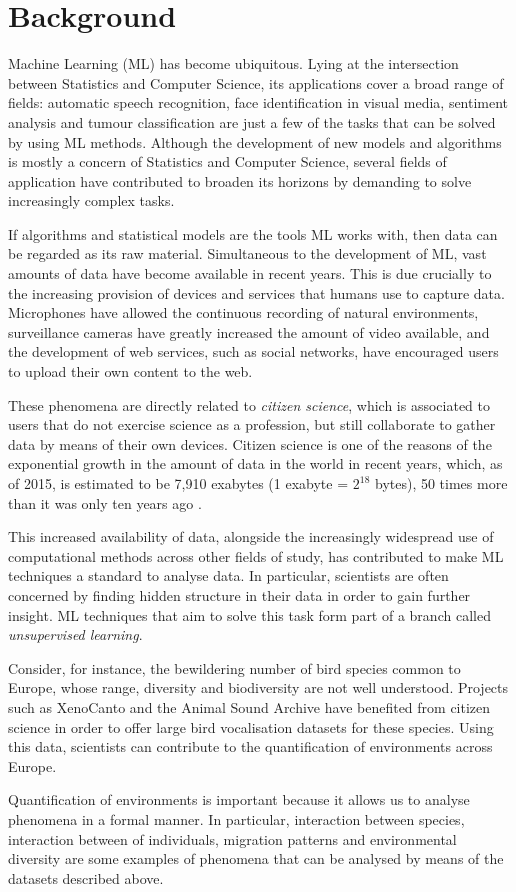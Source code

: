 \documentclass[../main.tex]{subfiles}
\begin{document}
 \label{chapter_intro}
\section{Background}
Machine Learning (ML) has become ubiquitous. Lying at the intersection between Statistics and Computer Science, its applications cover a broad range of fields: automatic speech recognition, face identification in visual media, sentiment analysis and tumour classification are just a few of the tasks that can be solved by using ML methods. Although the development of new models and algorithms is mostly a concern of Statistics and Computer Science, several fields of application have contributed to broaden its horizons by demanding to solve increasingly complex tasks. 
\par If algorithms and statistical models are the tools ML works with, then data can be regarded as its raw material. Simultaneous to the development of ML, vast amounts of data have become available in recent years. This is due crucially to the increasing provision of devices and services that humans use to capture data. Microphones have allowed the continuous recording of natural environments, surveillance cameras have greatly increased the amount of video available, and the development of web services, such as social networks, have encouraged users to upload their own content to the web. 
\par These phenomena are directly related to \emph{citizen science}, which is associated to users that do not exercise science as a profession, but still collaborate to gather data by means of their own devices. Citizen science is one of the reasons of the exponential growth in the amount of data in the world in recent years, which, as of 2015, is estimated to be 7,910 exabytes (1 exabyte = $2^{18}$ bytes), 50 times more than it was only ten years ago \cite{TheEconomistOnline2011}.
\par This increased availability of data, alongside the increasingly widespread use of computational methods across other fields of study, has contributed to make ML techniques a standard to analyse data. In particular, scientists are often concerned by finding hidden structure in their data in order to gain further insight. ML techniques that aim to solve this task form part of a branch called \emph{unsupervised learning}. 
\par Consider, for instance, the bewildering number of bird species common to Europe, whose range, diversity and biodiversity are not well understood. Projects such as XenoCanto and the Animal Sound Archive have benefited from citizen science in order to offer large bird vocalisation datasets for these species. Using this data, scientists can contribute to the quantification of environments across Europe.
\par Quantification of environments is important because it allows us to analyse phenomena in a formal manner. In particular, interaction between species, interaction between of individuals, migration patterns and environmental diversity are some examples of phenomena that can be analysed by means of the datasets described above.
\end{document}
